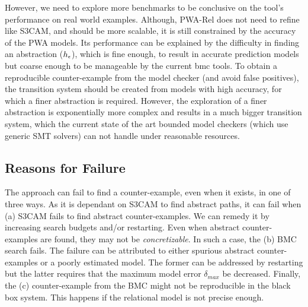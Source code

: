 However, we need to explore more benchmarks to be conclusive on the
tool's performance on real world examples. Although, PWA-Rel does not
need to refine like S3CAM, and should be more scalable, it is still
constrained by the accuracy of the PWA models. Its performance can be
explained by the difficulty in finding an abstraction
($h_\epsilon$), which is fine enough, to result in accurate
prediction models but coarse enough to be manageable by the current
bmc tools.  To obtain a reproducible counter-example from the model
checker (and avoid false positives), the transition system should be
created from models with high accuracy, for which a finer abstraction
is required.  However, the exploration of a finer abstraction is
exponentially more complex and results in a much bigger transition
system, which the current state of the art bounded model checkers
(which use generic SMT solvers) can not handle under reasonable
resources.

\subsection{Reasons for Failure}

The approach can fail to find a counter-example, even when it exists,
in one of three ways. As it is dependant on S3CAM to find abstract
paths, it can fail when (a) S3CAM fails to find abstract
counter-examples. We can remedy it by increasing search budgets and/or
restarting. Even when abstract counter-examples are found, they may
not be \emph{concretizable}. In such a case, the (b) BMC search fails.
The failure can be attributed to either spurious abstract
counter-examples or a poorly estimated model. The former can be
addressed by restarting but the latter requires that the maximum model
error $\delta_{max}$ be decreased. Finally, the (c) counter-example
from the BMC might not be reproducible in the black box system. This
happens if the relational model is not precise enough.
